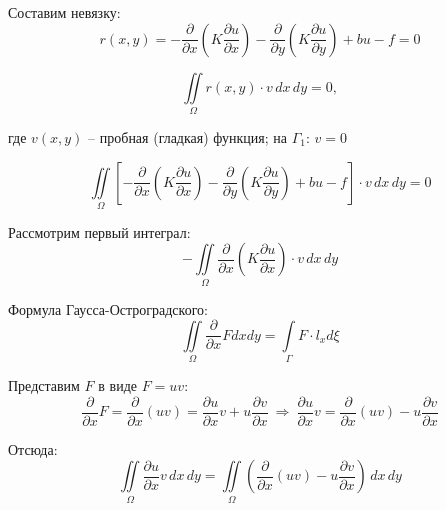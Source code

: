 \documentclass{bmstu}
\begin{document}
	
	Составим невязку:
	\[r(x, y) = -\frac{\partial}{\partial x} \left( K \frac{\partial u}{\partial x} \right) -\frac{\partial}{\partial y} \left( K \frac{\partial u}{\partial y} \right) + bu - f = 0\]
	
	\[\iint\limits_{\Omega} r(x, y) \cdot v \, dx \, dy = 0,\]
	
	где $v(x, y)$ -- пробная (гладкая) функция; на $\Gamma_1$: $v = 0$
	
	\begin{equation}\label{iint}
	\iint\limits_{\Omega} \left [ -\frac{\partial}{\partial x} \left( K \frac{\partial u}{\partial x} \right) -\frac{\partial}{\partial y} \left( K \frac{\partial u}{\partial y} \right) + bu - f \right ] \cdot v \, dx \, dy = 0
	\end{equation}
	
	Рассмотрим первый интеграл:
	\[-\iint\limits_{\Omega} \frac{\partial}{\partial x} \left( K \frac{\partial u}{\partial x} \right) \cdot v \, dx \, dy\]
	
	Формула Гаусса-Остроградского:
	\[\iint\limits_{\Omega} \frac{\partial}{\partial x} F dx dy = \int \limits_{\Gamma} F \cdot l_x d \xi\]
	
	Представим $F$ в виде $F = uv$:
	\[\frac{\partial}{\partial x} F = \frac{\partial}{\partial x} (uv) = \frac{\partial u}{\partial x} v + u \frac{\partial v}{\partial x}\ \Rightarrow\ 
	\frac{\partial u}{\partial x} v = \frac{\partial}{\partial x} (uv) - u \frac{\partial v}{\partial x}\]
	
	Отсюда:
	\[\iint\limits_{\Omega} \frac{\partial u}{\partial x} v \, dx \, dy = \iint\limits_{\Omega} \left( \frac{\partial}{\partial x} (uv) - u \frac{\partial v}{\partial x} \right) \, dx \, dy\]
	
\end{document}
